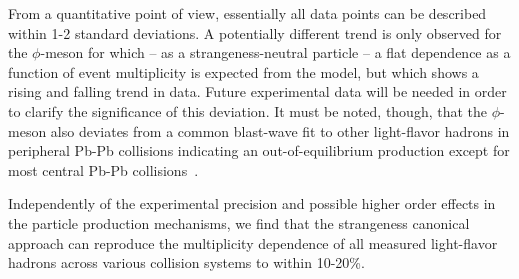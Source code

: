  
From a quantitative point of view, essentially all data points can be described within 1-2 standard deviations. A potentially different trend is only observed for the $\phi$-meson for which -- as a strangeness-neutral particle -- a flat dependence as a function of event multiplicity is expected from the model, but which shows a rising and falling trend in data. Future experimental data will be needed in order to clarify the significance of this deviation. It must be noted, though, that the $\phi$-meson also deviates from a common blast-wave fit to other light-flavor hadrons in peripheral Pb-Pb collisions indicating an out-of-equilibrium production except for most central Pb-Pb collisions~\cite{Abelev:2014uua}.

Independently of the experimental precision and possible higher order effects in the particle production mechanisms, we find that the strangeness canonical approach can reproduce the multiplicity dependence of all measured 
light-flavor hadrons across various collision systems to within 10-20\%.



